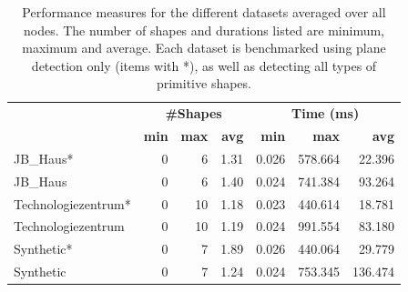 \begin{table}[h]
    \centering
    \begin{tabular}{ l || r | r | r || r | r | r}
            &\multicolumn{3}{c||}{\textbf{\#Shapes}} & \multicolumn{3}{c}{\textbf{Time (ms)}}\\
            &\textbf{min} & \textbf{max} & \textbf{avg}  & \textbf{min} & \textbf{max} & \textbf{avg}  \\
            \hline
            JB\_Haus*           & 0 & 6  & 1.31 & 0.026 & 578.664 &  22.396 \\
            JB\_Haus            & 0 & 6  & 1.40 & 0.024 & 741.384 &  93.264 \\
            Technologiezentrum* & 0 & 10 & 1.18 & 0.023 & 440.614 &  18.781 \\
            Technologiezentrum  & 0 & 10 & 1.19 & 0.024 & 991.554 &  83.180 \\
            Synthetic*          & 0 & 7  & 1.89 & 0.026 & 440.064 &  29.779 \\
            Synthetic           & 0 & 7  & 1.24 & 0.024 & 753.345 & 136.474 \\
        \end{tabular}
    \caption[Shape-detection performance measure for different datasets]
        {Performance measures for the different datasets averaged over all nodes. The number of shapes and durations listed are minimum, maximum and average. Each dataset is benchmarked using plane detection only (items with *), as well as detecting all types of primitive shapes. }
    \label{table:schnabel_benchmarks}
\end{table}



